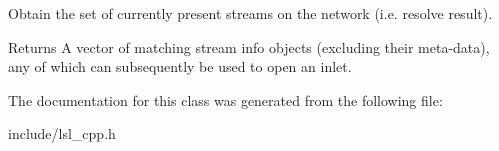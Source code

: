 Obtain the set of currently present streams on the network (i.\+e. resolve result). \begin{DoxyReturn}{Returns}
A vector of matching stream info objects (excluding their meta-\/data), any of which can subsequently be used to open an inlet. 
\end{DoxyReturn}


The documentation for this class was generated from the following file\+:\begin{DoxyCompactItemize}
\item 
include/lsl\+\_\+cpp.\+h\end{DoxyCompactItemize}
